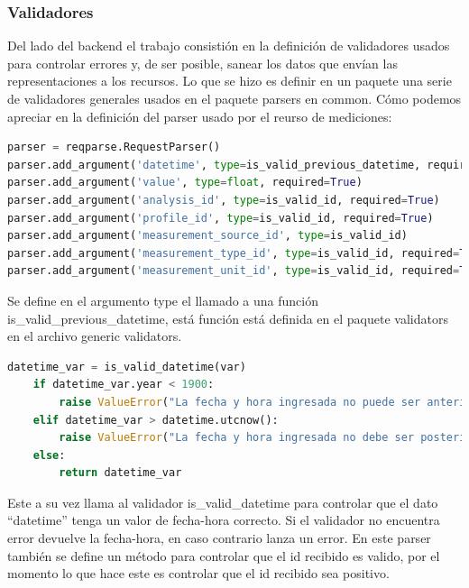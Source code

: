 \documentclass[a4paper,12pt]{article}
\begin{document}
\subsubsection{Validadores}
Del lado del backend el trabajo consistión en la definición de validadores usados para controlar errores y, de ser posible, sanear los datos que envían las representaciones a los recursos. Lo que se hizo es definir en un paquete una serie de validadores generales usados en el paquete parsers en common. Cómo podemos apreciar en la definición del parser usado por el reurso de mediciones:

\begin{lstlisting}[language=Python]
parser = reqparse.RequestParser()
parser.add_argument('datetime', type=is_valid_previous_datetime, required=True)
parser.add_argument('value', type=float, required=True)
parser.add_argument('analysis_id', type=is_valid_id, required=True)
parser.add_argument('profile_id', type=is_valid_id, required=True)
parser.add_argument('measurement_source_id', type=is_valid_id)
parser.add_argument('measurement_type_id', type=is_valid_id, required=True)
parser.add_argument('measurement_unit_id', type=is_valid_id, required=True)
\end{lstlisting}

Se define en el argumento type el llamado a una función is\_valid\_previous\_datetime, está función está definida en el paquete validators en el archivo generic validators.

\begin{lstlisting}[language=Python]
    datetime_var = is_valid_datetime(var)
    if datetime_var.year < 1900:
        raise ValueError("La fecha y hora ingresada no puede ser anterior al anio 1900.")
    elif datetime_var > datetime.utcnow():
        raise ValueError("La fecha y hora ingresada no debe ser posterior a la fecha y hora actual.")
    else:
        return datetime_var
\end{lstlisting}

Este a su vez llama al validador is\_valid\_datetime para controlar que el dato ``datetime'' tenga un valor de fecha-hora correcto. Si el validador no encuentra error devuelve la fecha-hora, en caso contrario lanza un error.
En este parser también se define un método para controlar que el id recibido es valido, por el momento lo que hace este es controlar que el id recibido sea positivo.

\end{document}
